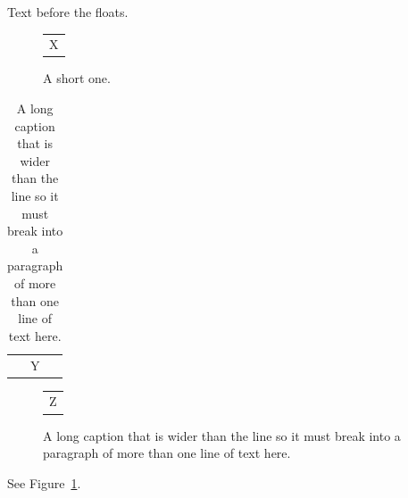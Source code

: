 \documentclass{article}
\begin{document}
Text before the floats.
\begin{figure}[h]
\centering
\begin{tabular}{c}X\end{tabular}
\caption{A short one.}
\label{fig:a}
\end{figure}
\begin{table}[h]
\caption{A long caption that is wider than the line so it must break into a paragraph of more than one line of text here.}
\begin{tabular}{c}Y\end{tabular}
\end{table}
\begin{figure}[h]
\centering
\begin{tabular}{c}Z\end{tabular}
\caption{A long caption that is wider than the line so it must break into a paragraph of more than one line of text here.}
\end{figure}
See Figure~\ref{fig:a}.
\end{document}
